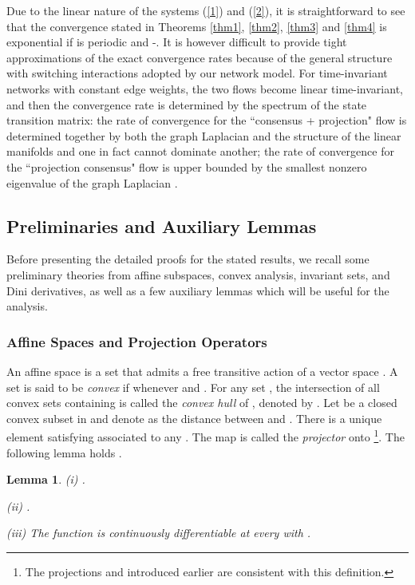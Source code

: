 \documentclass[a4paper, 11pt]{article}
\newtheorem{lemma}{Lemma}
\begin{document}
 Due to the linear nature of the systems (\ref{1}) and (\ref{2}), it is straightforward to see that  the convergence stated in Theorems \ref{thm1}, \ref{thm2}, \ref{thm3} and \ref{thm4} is   exponential if  is periodic and  -. It is however difficult to provide tight approximations of the exact convergence rates because of the general  structure with switching interactions adopted by our network model. For time-invariant networks with constant edge weights, the two flows become linear time-invariant,  and then  the convergence rate is determined by the spectrum of the state transition matrix: the rate of convergence for the  ``consensus + projection" flow is determined together by both the graph Laplacian and the structure of the linear manifolds  and one in fact cannot dominate another;  the rate of convergence for the ``projection consensus" flow is upper bounded by the smallest nonzero eigenvalue of the graph Laplacian \cite{brian15}.




\subsection{Preliminaries and Auxiliary Lemmas}
Before presenting the detailed proofs for the stated results, we recall  some preliminary theories from  affine subspaces, convex analysis,  invariant sets, and  Dini derivatives, as well as a few auxiliary lemmas which will be useful  for the analysis.



\subsubsection{Affine Spaces and  Projection Operators}



An affine space is a set  that admits a free transitive action of a vector space . A set  is said to be {\it convex} if  whenever  and  \cite{rock}.
For any set , the intersection of all convex sets
containing  is called the {\it convex hull} of , denoted by
. Let  be a closed convex subset in  and denote
 as the distance between  and .  There is a unique element  satisfying
 associated to any
 \cite{aubin}.  The map  is called the {\it projector} onto \footnote{The projections  and  introduced earlier are consistent with this definition.}. The following lemma holds  \cite{aubin}.
\begin{lemma}\label{lemconvex}
(i) .

(ii) .

(iii)  The function  is continuously differentiable at every  with .
\end{lemma}
\end{document}
